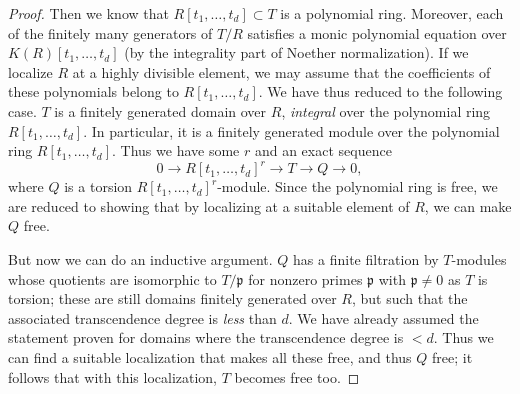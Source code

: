 \begin{proof}
Then we know that $R[t_1, \dots, t_d] \subset T$ is  a polynomial ring.
Moreover, each of the finitely many generators of $T/R$ satisfies a monic polynomial
equation over $K(R)[t_1, \dots, t_d]$ (by the integrality part of Noether
normalization). If we localize $R$ at a highly divisible element, we may
assume that the coefficients of these polynomials belong to $R[t_1, \dots,
t_d]$. 
We have thus reduced to the following case. $T$ is a finitely generated domain
over $R$, \emph{integral} over the polynomial ring $R[t_1, \dots, t_d]$. In
particular, it is a finitely generated module over the polynomial ring $R[t_1,
\dots, t_d]$.
Thus we have some $r$ and an exact sequence
\[ 0 \to R[t_1, \dots, t_d]^r \to T \to Q \to 0,  \]
where $Q$ is a torsion $R[t_1, \dots, t_d]^r$-module. Since the polynomial
ring is free, we are reduced to showing that by localizing at a suitable
element of $R$, we can make  $Q$ free. 

But now we can do an inductive argument. $Q$ has a  finite filtration by
$T$-modules whose
quotients are isomorphic to $T/\mathfrak{p}$ for nonzero primes
$\mathfrak{p}$ with $\mathfrak{p} \neq 0$ as $T$ is torsion; these are still domains finitely generated over $R$, but such
that the associated transcendence degree is \emph{less} than $d$. We have
already assumed the statement proven for domains where the transcendence
degree is $< d$. Thus we can
find a suitable localization that makes all these  free, and thus $Q$ free; it
follows that with this localization, $T$ becomes free too.
\end{proof} 



